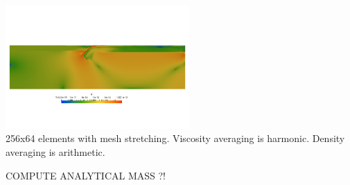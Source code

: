\begin{center}
\includegraphics[width=7cm]{python_codes/fieldstone_67/images/sr}\\
{\captionfont 256x64 elements with mesh stretching. Viscosity averaging is harmonic.
Density averaging is arithmetic.}
\end{center}

COMPUTE ANALYTICAL MASS ?!
